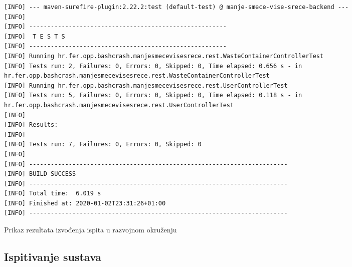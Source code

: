 \begin{listing}[H]
	\begin{verbatim}
[INFO] --- maven-surefire-plugin:2.22.2:test (default-test) @ manje-smece-vise-srece-backend ---
[INFO] 
[INFO] -------------------------------------------------------
[INFO]  T E S T S
[INFO] -------------------------------------------------------
[INFO] Running hr.fer.opp.bashcrash.manjesmecevisesrece.rest.WasteContainerControllerTest
[INFO] Tests run: 2, Failures: 0, Errors: 0, Skipped: 0, Time elapsed: 0.656 s - in hr.fer.opp.bashcrash.manjesmecevisesrece.rest.WasteContainerControllerTest
[INFO] Running hr.fer.opp.bashcrash.manjesmecevisesrece.rest.UserControllerTest
[INFO] Tests run: 5, Failures: 0, Errors: 0, Skipped: 0, Time elapsed: 0.118 s - in hr.fer.opp.bashcrash.manjesmecevisesrece.rest.UserControllerTest
[INFO] 
[INFO] Results:
[INFO] 
[INFO] Tests run: 7, Failures: 0, Errors: 0, Skipped: 0
[INFO] 
[INFO] ------------------------------------------------------------------------
[INFO] BUILD SUCCESS
[INFO] ------------------------------------------------------------------------
[INFO] Total time:  6.019 s
[INFO] Finished at: 2020-01-02T23:31:26+01:00
[INFO] ------------------------------------------------------------------------
	\end{verbatim}
	\caption{Prikaz rezultata izvođenja ispita u razvojnom okruženju}
\end{listing}
			
			\subsection{Ispitivanje sustava}
			
%			 
			
